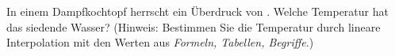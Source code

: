 In einem Dampfkochtopf herrscht ein Überdruck von \pUeO. Welche Temperatur hat das siedende Wasser? (Hinweis: Bestimmen Sie die Temperatur durch lineare Interpolation mit den Werten aus \emph{Formeln, Tabellen, Begriffe}.)
